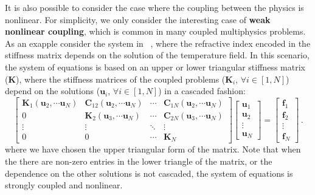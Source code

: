     It is also possible to consider the case where the coupling between the physics is 
    nonlinear. For simplicity, we only consider the interesting case of \textbf{weak nonlinear coupling},
    which is common in many
    coupled multiphysics problems. As an exapple consider the system in ~\cite{ownpub0}, where the refractive index encoded in 
    the stiffness matrix depends on the solution of the temperature field.
     In this scenario, the system of equations is based on an upper or lower triangular stiffness matrix ($\mathbf{K}$), where the stiffness matrices of the coupled 
     problems ($\mathbf{K}_i$, $\forall i\in[1,N]$) depend 
     on the solutions ($\mathbf{u}_i$, $\forall i\in[1,N]$) in a cascaded fashion:
     \begin{equation} \label{eq:multiphysics_weak_nonlinear}
        \begin{bmatrix}
            \mathbf{K}_1(\mathbf{u}_2, \cdots \mathbf{u}_N)    & \mathbf{C}_{12} (\mathbf{u}_2, \cdots \mathbf{u}_N)& \cdots & \mathbf{C}_{1N}(\mathbf{u}_2, \cdots \mathbf{u}_N) \\
            0 & \mathbf{K}_2 (\mathbf{u}_3, \cdots \mathbf{u}_N)   & \cdots & \mathbf{C}_{2N} (\mathbf{u}_3, \cdots \mathbf{u}_N)\\
            \vdots          & \vdots          & \ddots & \vdots          \\
            0& 0 & \cdots & \mathbf{K}_N
        \end{bmatrix}
        \begin{bmatrix}
            \mathbf{u}_1 \\
            \mathbf{u}_2 \\
            \vdots       \\
            \mathbf{u}_N
        \end{bmatrix}
        =
        \begin{bmatrix}
            \mathbf{f}_1\\
            \mathbf{f}_2\\
            \vdots       \\
            \mathbf{f}_N
        \end{bmatrix}\,.
    \end{equation}
    where we have chosen the upper triangular form of the matrix.
    Note that when the there are non-zero entries in the lower triangle of the matrix, or the dependence on the
    other solutions is not cascaded, the system of equations is strongly coupled and nonlinear.

